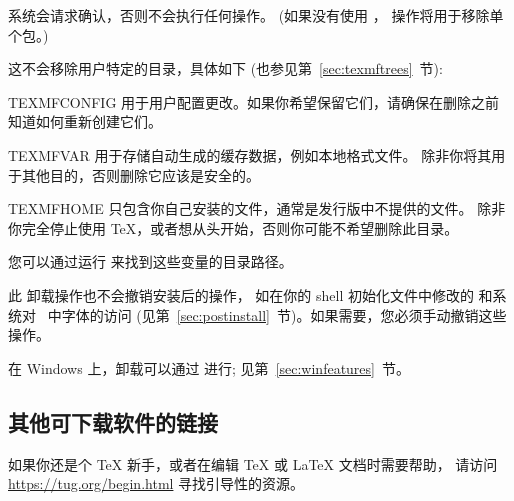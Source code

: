 \documentclass{article}
\begin{document}
\begin{alltt}
\end{alltt}

系统会请求确认，否则不会执行任何操作。
(如果没有使用 ， 操作将用于移除单个包。)

这不会移除用户特定的目录，具体如下 (也参见第~\ref{sec:texmftrees}~节): 

\begin{ttdescription}
\item [TEXMFCONFIG] 用于用户配置更改。如果你希望保留它们，请确保在删除之前知道如何重新创建它们。

\item [TEXMFVAR] 用于存储自动生成的缓存数据，例如本地格式文件。
除非你将其用于其他目的，否则删除它应该是安全的。

\item [TEXMFHOME] 只包含你自己安装的文件，通常是发行版中不提供的文件。
除非你完全停止使用 \TeX，或者想从头开始，否则你可能不希望删除此目录。

\end{ttdescription}

\noindent 您可以通过运行  来找到这些变量的目录路径。

此  卸载操作也不会撤销安装后的操作，
如在你的 shell 初始化文件中修改的  和系统对 \TL\ 中字体的访问
(见第~\ref{sec:postinstall}~节)。如果需要，您必须手动撤销这些操作。

在 Windows 上，卸载可以通过 \GUI 进行; 见第~\ref{sec:winfeatures}~节。

\subsection{其他可下载软件的链接}

如果你还是个 \TeX{} 新手，或者在编辑 \TeX{} 或 \LaTeX{} 文档时需要帮助，
请访问 \url{https://tug.org/begin.html} 寻找引导性的资源。
\end{document}
